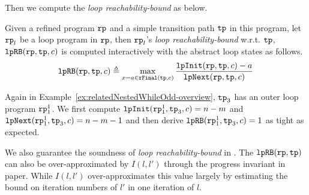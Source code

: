 %
Then we compute the
\emph{loop reachability-bound} as below.
\begin{defn}
 \label{def:looprb}
 Given a refined program $\mathtt{rp}$ and a simple transition path $\mathtt{tp}$ in this program, 
 let $\mathtt{rp}_l$ be a loop program in $\mathtt{rp}$,
 then $\mathtt{rp}_l$'s \emph{loop reachability-bound} w.r.t. $\mathtt{tp}$, $\mathtt{lpRB}(\mathtt{rp}, \mathtt{tp}, c)$
 is computed interactively with the abstract loop states as follows. 
 \[
 \mathtt{lpRB}(\mathtt{rp}, \mathtt{tp}, c) \triangleq
 \max\limits_{x = a \in \mathtt{rFinal}(\mathtt{tp}, c)}
 \frac{\mathtt{lpInit}(\mathtt{rp}, \mathtt{tp}, c) - a }{\mathtt{lpNext}(\mathtt{rp}, \mathtt{tp}, c)}
 \]
\end{defn}
%
Again in Example~\ref{ex:relatedNestedWhileOdd-overview}, $\mathtt{tp}_3$ has an outer loop program $\mathtt{rp}_1^1$.
We first compute $\mathtt{lpInit}(\mathtt{rp}_1^1, \mathtt{tp}_3, c) = n - m $ and $\mathtt{lpNext}(\mathtt{rp}_1^1, \mathtt{tp}_3, c) = n - m - 1$ and then derive $\mathtt{lpRB}(\mathtt{rp}_1^1, \mathtt{tp}_3, c) = 1$ as tight as expected.
%

We also guarantee the soundness of \emph{loop reachability-bound} in .
The $\mathtt{lpRB}(\mathtt{rp}, \mathtt{tp})$ 
can also be over-approximated by
$I(l, l')$ through the progress invariant in paper\cite{GulwaniJK09}.
While $I(l, l')$ over-approximates this value largely
by estimating the bound on iteration numbers of $l'$ in one iteration of $l$.

